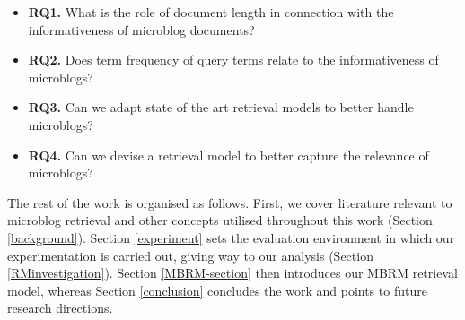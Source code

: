 \begin{itemize}
%

\item[] \textbf{RQ1.} What is the role of document length in connection with the informativeness of microblog documents?
\item[] \textbf{RQ2.} Does term frequency of query terms relate to the informativeness of microblogs? 
\item[] \textbf{RQ3.} Can we adapt state of the art retrieval models to better handle microblogs?
\item[] \textbf{RQ4.} Can we devise a retrieval model to better capture the relevance of microblogs?


\end{itemize}

The rest of the work is organised as follows. First, we cover literature relevant to microblog retrieval and other concepts utilised throughout this work (Section \ref{background}). Section \ref{experiment} sets the evaluation environment in which our experimentation is carried out, giving way to our analysis (Section \ref{RMinvestigation}). Section \ref{MBRM-section} then introduces our MBRM retrieval model, whereas Section \ref{conclusion} concludes the work and points to future research directions.

